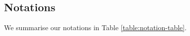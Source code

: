


\subsection{Notations}\label{sec:notation-table}

We summarise our notations in Table \ref{table:notation-table}.


\begin{table*}[!htb]
\begin{scriptsize}
\begin{center}
\footnotesize{
\caption{ \small{Notation Table}.}\label{commu-breakdown-party} 
\renewcommand{\arraystretch}{1}
}
\end{center}
\end{scriptsize}
\end{table*}
